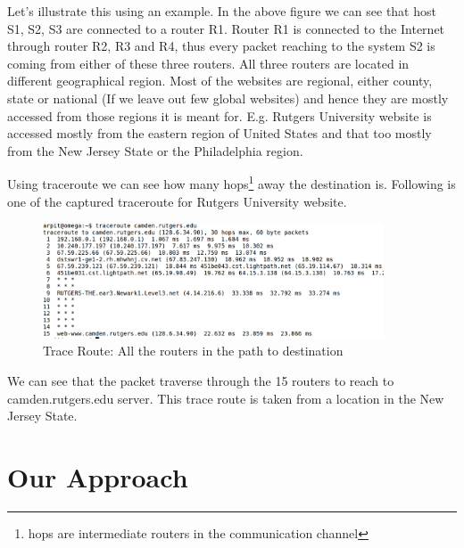 \documentclass[12pt,oneside,a4paper]{article}
\begin{document}
Let's illustrate this using an example. In the above figure we can see that host S1, S2, S3 are connected to a router R1. Router R1 is connected to the Internet through router R2, R3 and R4, thus every packet reaching to the system S2 is coming from either of these three routers. All three routers are located in different geographical region. Most of the websites are regional, either county, state or national (If we leave out few global websites) and hence they are mostly accessed from those regions it is meant for. E.g. Rutgers University website is accessed mostly from the eastern region of United States and that too mostly from the New Jersey State or the Philadelphia region.\par
Using traceroute we can see how many hops\footnote{hops are intermediate routers in the communication channel} away the destination is. Following is one of the captured traceroute for Rutgers University website.\par
\begin{figure}[H]
\centering
\includegraphics[width=0.90\textwidth]{TraceRoute.png}
\caption{Trace Route: All the routers in the path to destination} \label{fig:traceroute}
\end{figure}

We can see that the packet traverse through the 15 routers to reach to camden.rutgers.edu server. This trace route is taken from a location in the New Jersey State.\par

\section{Our Approach}
\end{document}
